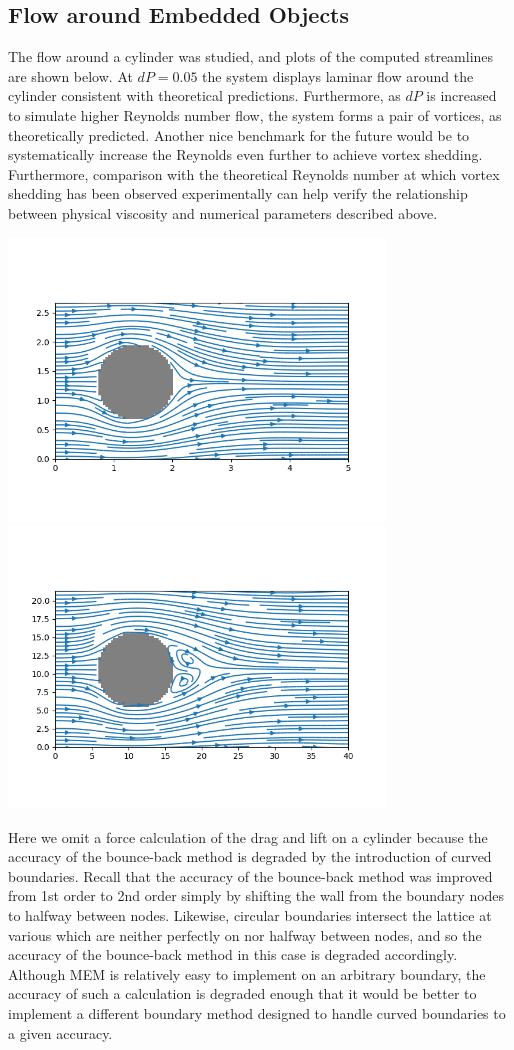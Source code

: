 \documentclass[a4paper]{article}
\begin{document}
\subsection{Flow around Embedded Objects}
The flow around a cylinder was studied, and plots of the computed streamlines are shown below. At $dP=0.05$ the system displays laminar flow around the cylinder consistent with theoretical predictions. Furthermore, as $dP$ is increased to simulate higher Reynolds number flow, the system forms a pair of vortices, as theoretically predicted. Another nice benchmark for the future would be to systematically increase the Reynolds even further to achieve vortex shedding. Furthermore, comparison with the theoretical Reynolds number at which vortex shedding has been observed experimentally can help verify the relationship between physical viscosity and numerical parameters described above. 
\begin{center}
\includegraphics[width=10cm]{cyl.png}
\includegraphics[width=10cm]{vortices.png}
\end{center}
Here we omit a force calculation of the drag and lift on a cylinder because the accuracy of the bounce-back method is degraded by the introduction of curved boundaries. Recall that the accuracy of the bounce-back method was improved from 1st order to 2nd order simply by shifting the wall from the boundary nodes to halfway between nodes. Likewise, circular boundaries intersect the lattice at various which are neither perfectly on nor halfway between nodes, and so the accuracy of the bounce-back method in this case is degraded accordingly. Although MEM is relatively easy to implement on an arbitrary boundary, the accuracy of such a calculation is degraded enough that it would be better to implement a different boundary method designed to handle curved boundaries to a given accuracy. 
\end{document}
